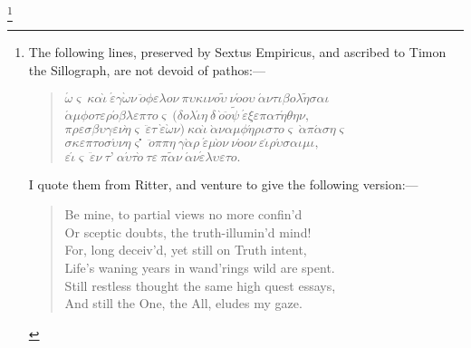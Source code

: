 \documentclass[oneside]{book}
\begin{document}
\footnote{The following lines, preserved by Sextus Empiricus, and ascribed to Timon
the Sillograph, are not devoid of pathos:---
\begin{verse}
$\acute{\omega}\varsigma\ \kappa\alpha\grave{\iota}\ \acute{\varepsilon}\gamma\grave{\omega}\nu\ \ddot{o}\phi\varepsilon\lambda{o}\nu\ \pi\upsilon\kappa\iota\nu{o}\tilde{\upsilon}\ \nu\acute{o}{o}\upsilon\ \acute{\alpha}\nu\tau\iota\beta{o}\lambda\tilde{\eta}\sigma\alpha\iota
$\\$
\acute{\alpha}\mu\phi{o}\tau\varepsilon\rho\acute{o}\beta\lambda%
\varepsilon\pi\tau{o}\varsigma\ (\delta{o}\lambda\acute{\iota}\eta\ \delta\acute{}\ \grave{o}\ddot{o}\tilde{\psi}\ \acute{\varepsilon}\xi\varepsilon\pi\alpha\tau\acute{\eta}\theta\eta\nu,
$\\$
\pi\rho\varepsilon\sigma\beta\upsilon\gamma\varepsilon\nu\grave{\eta}%
\varsigma\ \ddot{\varepsilon}\tau\ \grave{\varepsilon}\grave{\omega}\nu)\ \kappa\alpha\grave{\iota}\ \grave{\alpha}\nu\alpha\mu\phi\acute{\eta}\rho\iota\sigma\tau{o}%
\varsigma\ \grave{\alpha}\pi\acute{\alpha}\sigma\eta\varsigma
$\\$
\sigma\kappa\varepsilon\pi\tau{o}\sigma\acute{\upsilon}\nu\eta%
\varsigma^{\centerdot}\ \ddot{o}\pi\pi\eta\ \gamma\grave{\alpha}\rho\ \acute{\varepsilon}\mu\grave{o}\nu\ \nu\acute{o}{o}\nu\ \varepsilon\acute{\iota}\rho\acute{\upsilon}\sigma\alpha\iota\mu\iota,
$\\$
\varepsilon\acute{\iota}\varsigma\ \ddot{\varepsilon}\nu\ \tau\text{'}\ \alpha\acute{\upsilon}\tau\grave{o}\ \tau\varepsilon\ \pi\tilde{\alpha}\nu\ \acute{\alpha}\nu\acute{\varepsilon}\lambda\upsilon\varepsilon\tau{o}.$
\end{verse}
%
I quote them from Ritter, and venture to give the following version:---
\begin{verse}
Be mine, to partial views no more confin'd\\
Or sceptic doubts, the truth-illumin'd mind!\\
For, long deceiv'd, yet still on Truth intent,\\
Life's waning years in wand'rings wild are spent.\\
Still restless thought the same high quest essays,\\
And still the One, the All, eludes my gaze.
\end{verse}
}%
\end{document}
